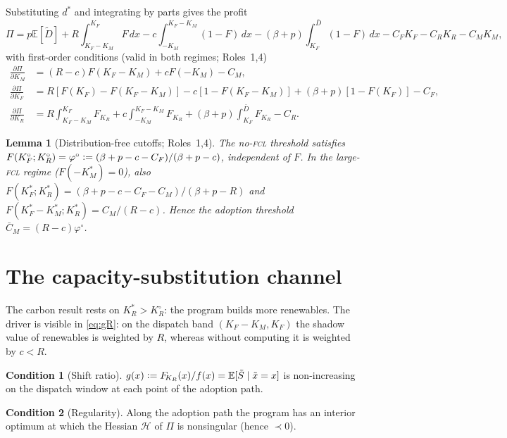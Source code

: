\documentclass[11pt,reqno]{amsart}
\theoremstyle{plain}
\newtheorem{lemma}{Lemma}\newtheorem{corollary}{Corollary}
\theoremstyle{definition}\newtheorem{condition}{Condition}\newtheorem{assumption}{Assumption}
\theoremstyle{remark}\newtheorem{remark}{Remark}
\newcommand{\KR}{K_R}\newcommand{\KF}{K_F}\newcommand{\KM}{K_M}
\newcommand{\KRs}{K_R^{*}}\newcommand{\KFs}{K_F^{*}}\newcommand{\KMs}{K_M^{*}}
\newcommand{\KRo}{K_R^{\circ}}\newcommand{\KFo}{K_F^{\circ}}
\newcommand{\Dbar}{\bar D}\newcommand{\CM}{C_M}\newcommand{\CF}{C_F}\newcommand{\CR}{C_R}
\newcommand{\CMbar}{\bar C_M}\newcommand{\bp}{\beta+p}\newcommand{\FKR}{F_{\!\KR}}
\newcommand{\E}{\mathbb{E}}\newcommand{\PP}{\mathbb{P}}\newcommand{\eqdef}{\vcentcolon=}
\begin{document}
Substituting $d^{*}$ and integrating by parts gives the profit
\begin{equation}\label{eq:profit}
  \Pi=p\E[\tilde D]+R\!\!\int_{\KF-\KM}^{\KF}\!\!F\,dx
  -c\!\!\int_{-\KM}^{\KF-\KM}\!\!(1-F)\,dx
  -(\bp)\!\!\int_{\KF}^{\Dbar}\!\!(1-F)\,dx-\CF\KF-\CR\KR-\CM\KM,
\end{equation}
with first-order conditions (valid in both regimes; Roles~1,4)
\begin{align}
  \tfrac{\partial\Pi}{\partial\KM}&=(R-c)F(\KF-\KM)+cF(-\KM)-\CM,\label{eq:gM}\\
  \tfrac{\partial\Pi}{\partial\KF}&=R[F(\KF)-F(\KF-\KM)]-c[1-F(\KF-\KM)]+(\bp)[1-F(\KF)]-\CF,\label{eq:gF}\\
  \tfrac{\partial\Pi}{\partial\KR}&=R\!\!\int_{\KF-\KM}^{\KF}\!\!\FKR+c\!\!\int_{-\KM}^{\KF-\KM}\!\!\FKR+(\bp)\!\!\int_{\KF}^{\Dbar}\!\!\FKR-\CR.\label{eq:gR}
\end{align}

\begin{lemma}[Distribution-free cutoffs; Roles~1,4]\label{lem:cutoffs}
The no-\textsc{fcl} threshold satisfies $F(\KFo;\KRo)=\varphi^{\circ}\eqdef(\bp-c-\CF)/(\bp-c)$,
independent of $F$. In the large-\textsc{fcl} regime ($F(-\KMs)=0$), also
$F(\KFs;\KRs)=(\bp-c-\CF-\CM)/(\bp-R)$ and $F(\KFs-\KMs;\KRs)=\CM/(R-c)$. Hence
the adoption threshold $\CMbar=(R-c)\varphi^{\circ}$.
\end{lemma}

\section{The capacity-substitution channel}\label{sec:channel}

The carbon result rests on $\KRs>\KRo$: the program builds more renewables.
The driver is visible in \eqref{eq:gR}: on the dispatch band $(\KF-\KM,\KF)$ the
shadow value of renewables is weighted by $R$, whereas without computing it is
weighted by $c<R$.

\begin{condition}[Shift ratio]\label{cond:cs}
$g(x)\eqdef\FKR(x)/f(x)=\E[\tilde S\mid\tilde x=x]$ is non-increasing on the
dispatch window at each point of the adoption path.
\end{condition}

\begin{condition}[Regularity]\label{cond:reg}
Along the adoption path the program has an interior optimum at which the Hessian
$\mathcal H$ of $\Pi$ is nonsingular (hence $\prec0$).
\end{condition}
\end{document}
